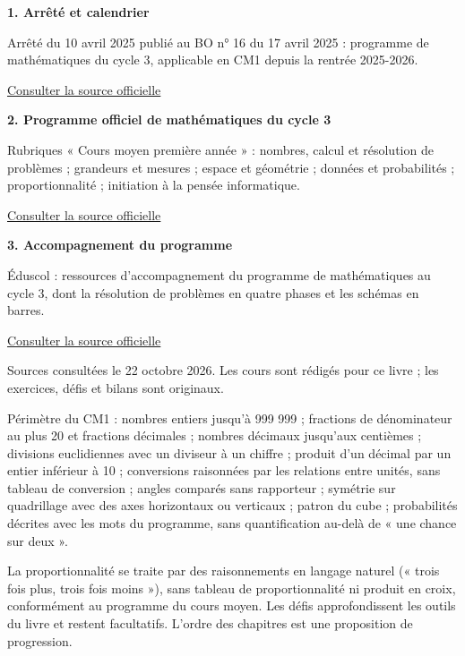 \clearpage\thispagestyle{otFront}\label{references}\fontsize{11}{15}\selectfont
\par\medskip\textbf{1. Arrêté et calendrier}\par Arrêté du 10 avril 2025 publié au BO n° 16 du 17 avril 2025 : programme de mathématiques du cycle 3, applicable en CM1 depuis la rentrée 2025-2026.\par\href{https://www.education.gouv.fr/bo/2025/Hebdo16/MENE2504620A}{\textcolor{otGreenDark}{Consulter la source officielle}}\par
\par\medskip\textbf{2. Programme officiel de mathématiques du cycle 3}\par Rubriques « Cours moyen première année » : nombres, calcul et résolution de problèmes ; grandeurs et mesures ; espace et géométrie ; données et probabilités ; proportionnalité ; initiation à la pensée informatique.\par\href{https://www.education.gouv.fr/sites/default/files/programme-de-math-matiques-pour-le-cycle-3-439827.pdf}{\textcolor{otGreenDark}{Consulter la source officielle}}\par
\par\medskip\textbf{3. Accompagnement du programme}\par Éduscol : ressources d’accompagnement du programme de mathématiques au cycle 3, dont la résolution de problèmes en quatre phases et les schémas en barres.\par\href{https://eduscol.education.gouv.fr/5712/ressources-d-accompagnement-du-programme-de-mathematiques-au-cycle-3}{\textcolor{otGreenDark}{Consulter la source officielle}}\par
\par\bigskip Sources consultées le 22 octobre 2026.
Les cours sont rédigés pour ce livre ; les exercices, défis et bilans
sont originaux.\par\medskip
Périmètre du CM1 : nombres entiers jusqu’à 999 999 ; fractions de
dénominateur au plus 20 et fractions décimales ; nombres décimaux
jusqu’aux centièmes ; divisions euclidiennes avec un diviseur à un
chiffre ; produit d’un décimal par un entier inférieur à 10 ;
conversions raisonnées par les relations entre unités, sans tableau
de conversion ; angles comparés sans rapporteur ; symétrie sur
quadrillage avec des axes horizontaux ou verticaux ; patron du cube ;
probabilités décrites avec les mots du programme, sans quantification
au-delà de « une chance sur deux ».\par\medskip
La proportionnalité se traite par des raisonnements en langage naturel
(« trois fois plus, trois fois moins »), sans tableau de proportionnalité
ni produit en croix, conformément au programme du cours moyen.
Les défis approfondissent les outils du livre et restent facultatifs.
L’ordre des chapitres est une proposition de progression.

\clearpage
